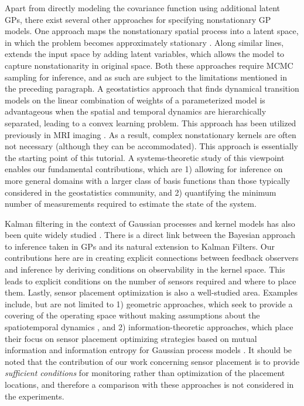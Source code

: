 \documentclass[letterpaper,12pt,peerreviewca,draftcls]{IEEEtran}
\begin{document}
Apart from directly modeling the covariance function using additional latent GPs, there exist several other approaches for specifying nonstationary GP models. One approach maps the nonstationary spatial process into a latent space, in which the problem becomes approximately stationary \cite{schmidt2003bayesian}. Along similar lines, \cite{pfingsten2006nonstationary} extends the input space by adding latent variables, which allows the model to capture  nonstationarity in original space. Both these approaches require MCMC sampling for inference, and as such are subject to the limitations mentioned in the preceding paragraph. 
A geostatistics approach that finds dynamical transition models on the linear combination of weights of a parameterized model \cite{cressie2011statistics,mardia1998kriged} is advantageous when the spatial and temporal dynamics are hierarchically separated, leading to a convex learning problem. This approach has been utilized previously in MRI imaging \cite{noh2007testing,noh2012space}. As a result, complex nonstationary kernels are often not necessary (although they can be accommodated). This approach is essentially the starting point of this tutorial. 
A systems-theoretic study of this viewpoint enables our fundamental contributions, which are 1) allowing for inference on more general domains with a larger class of basis functions than those typically considered in the geostatistics community, and 2) quantifying the minimum number of measurements required to estimate the state of the system. 

Kalman filtering in the context of Gaussian processes and kernel models has also been quite widely studied \cite{carron2016machine,hartikainen2010kalman,sarkka2013spatiotemporal,stroud2001dynamic,miller1986toward}.  There is a direct link between the Bayesian approach to inference taken in GPs and its natural extension to Kalman Filters. Our contributions here are in creating explicit connections between feedback observers and inference by deriving conditions on observability in the kernel space. This leads to explicit conditions on the number of sensors required and where to place them. Lastly, sensor placement optimization is also a well-studied area. Examples include, but are not limited to 1) geometric approaches, which seek to provide a covering of the operating space without making assumptions about the spatiotemporal dynamics \cite{egerstedt:bk:2010}, and 2) information-theoretic approaches, which place their focus on sensor placement optimizing strategies based on mutual information and information entropy for Gaussian process models \cite{Guestrin05_ICML}. It should be noted that the contribution of our work concerning sensor placement is to provide \emph{sufficient conditions} for monitoring rather than optimization of the placement locations, and therefore a comparison with these approaches is not considered in the experiments. 
\end{document}
